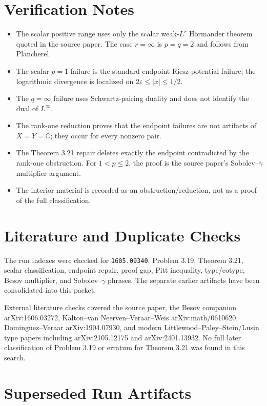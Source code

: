 \documentclass[11pt]{article}
\newcommand{\C}{\mathbb C}
\begin{document}
\section*{Verification Notes}

\begin{itemize}
\item The scalar positive range uses only the scalar weak-\(L^r\) H\"ormander theorem quoted in the source paper.  The case \(r=\infty\) is \(p=q=2\) and follows from Plancherel.
\item The scalar \(p=1\) failure is the standard endpoint Riesz-potential failure; the logarithmic divergence is localized on \(2\varepsilon\le |x|\le1/2\).
\item The \(q=\infty\) failure uses Schwartz-pairing duality and does not identify the dual of \(L^\infty\).
\item The rank-one reduction proves that the endpoint failures are not artifacts of \(X=Y=\C\); they occur for every nonzero pair.
\item The Theorem 3.21 repair deletes exactly the endpoint contradicted by the rank-one obstruction.  For \(1<p\le2\), the proof is the source paper's Sobolev--\(\gamma\) multiplier argument.
\item The interior material is recorded as an obstruction/reduction, not as a proof of the full classification.
\end{itemize}

\section*{Literature and Duplicate Checks}

The run indexes were checked for \texttt{1605.09340}, Problem 3.19, Theorem 3.21, scalar classification, endpoint repair, proof gap, Pitt inequality, type/cotype, Besov multiplier, and Sobolev--\(\gamma\) phrases.  The separate earlier artifacts have been consolidated into this packet.

External literature checks covered the source paper, the Besov companion arXiv:1606.03272, Kalton--van Neerven--Veraar--Weis arXiv:math/0610620, Dominguez--Veraar arXiv:1904.07930, and modern Littlewood--Paley--Stein/Lusin type papers including arXiv:2105.12175 and arXiv:2401.13932.  No full later classification of Problem 3.19 or erratum for Theorem 3.21 was found in this search.

\section*{Superseded Run Artifacts}
\end{document}
